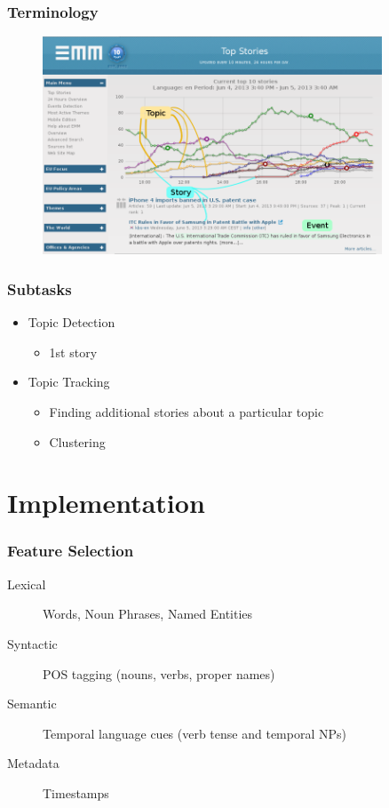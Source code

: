 \documentclass{beamer}
\begin{document}
\begin{frame}
  \frametitle{Terminology}
  \begin{figure}[h]
    \centering
    \includegraphics[width=0.9\textwidth]{images/emm_1}
  \end{figure}
\end{frame}

\begin{frame}
	\frametitle{Subtasks}
	\begin{itemize}
		\item Topic Detection
			\begin{itemize}
				\item 1st story
			\end{itemize}
		\item Topic Tracking
			\begin{itemize}
				\item Finding additional stories about a particular topic
				\item Clustering
			\end{itemize}
	\end{itemize}
\end{frame}

\section{Implementation}
\begin{frame}
	\frametitle{Feature Selection}
	\begin{description}
		\item[Lexical] Words, Noun Phrases, Named Entities
		\item[Syntactic] POS tagging (nouns, verbs, proper names)
		\item[Semantic] Temporal language cues (verb tense and temporal NPs)\citep{Makkonen:2003:RATDL}
		\item[Metadata] Timestamps
	\end{description}
\end{frame}
\end{document}
